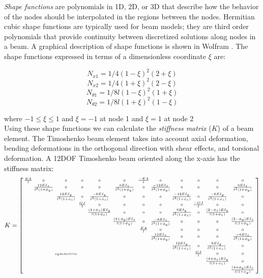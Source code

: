 {\textit{Shape functions} are polynomials in 1D, 2D, or 3D that describe how the behavior of the nodes should be interpolated in the regions between the nodes.  Hermitian cubic shape functions are typically used for beam models; they are third order polynomials that provide continuity between discretized solutions along nodes in a beam.  A graphical description of shape functions is shown in Wolfram \cite{Wolfram2016}.  The shape functions expressed in terms of a dimensionless coordinate $\xi$ are:

\[ N_{x1} = 1/4(1-\xi)^2(2+\xi) \]
\[ N_{x2} = 1/4(1+\xi)^2(2-\xi) \]
\[ N_{\theta1} = 1/8l(1-\xi)^2(1+\xi) \]
\[ N_{\theta2} = 1/8l(1+\xi)^2(1-\xi) \]

where $-1 \leq \xi \leq 1$ and $\xi = -1$ at node 1 and $\xi = 1$ at node 2\\

Using these shape functions we can calculate the \textit{stiffness matrix} ($K$) of a beam element.  The Timoshenko beam element takes into account axial deformation, bending deformations in the orthogonal direction with shear effects, and torsional deformation.  A 12DOF Timoshenko beam oriented along the x-axis has the stiffness matrix:\\

\[ K =  \scriptsize {\left[ \begin{smallmatrix}
\tfrac{EA}{l} & 0 & 0 & 0 & 0 & 0 & \tfrac{-EA}{l} & 0 & 0 & 0 & 0 & 0\\
 & \tfrac{12EI_z}{l^3(1+\phi_y)} & 0 & 0 & 0 & \tfrac{6EI_z}{l^2(1+\phi_y)} & 0 & \tfrac{-12EI_z}{l^3(1+\phi_y)} & 0 & 0 & 0 & \tfrac{6EI_z}{l^2(1+\phi_y)}\\
 &  & \tfrac{12EI_y}{l^3(1+\phi_z)} & 0 & \tfrac{-6EI_y}{l^2(1+\phi_z)} & 0 & 0 & 0 & \tfrac{-12EI_y}{l^3(1+\phi_z)} & 0 & \tfrac{-6EI_y}{l^2(1+\phi_z)} & 0\\
 &  &  &  \tfrac{GJ}{l} &  0 &  0 &  0 &  0 &  0 & \tfrac{-GJ}{l} & 0 & 0\\
 &  &  &  & \tfrac{(4+\phi_z)EI_y}{l(1+\phi_z)} & 0 & 0 & 0 & \tfrac{6EI_y}{l^2(1+\phi_z)} & 0 & \tfrac{(2-\phi_z)EI_y}{l(1+\phi_z)} & 0\\
 &  &  &  &  & \tfrac{(4+\phi_y)EI_z}{l(1+\phi_y)} & 0 & \tfrac{-6EI_z}{l^2(1+\phi_y)} & 0 & 0 & 0 & \tfrac{(2-\phi_y)EI_z}{l(1+\phi_y)}\\
 &  &  &  &  &  & \tfrac{EA}{l}  & 0 & 0 & 0 & 0 & 0\\
 &  &  &  &  &  &  & \tfrac{12EI_z}{l^3(1+\phi_y)} & 0 & 0 & 0 & \tfrac{-6EI_z}{l^2(1+\phi_y)}\\
 &  &  &  &  &  &  &  & \tfrac{12EI_y}{l^3(1+\phi_z)} & 0 & \tfrac{6EI_y}{l^2(1+\phi_z)}\ & 0\\
 &  & symmetric &  &  &  &  &  &  & \tfrac{GJ}{l} & 0 & 0\\
 &  &  &  &  &  &  &  &  &  & \tfrac{(4+\phi_z)EI_y}{l(1+\phi_z)} & 0\\
  &  &  &  &  &  &  &  &  &  &  & \tfrac{(4+\phi_y)EI_z}{l(1+\phi_y)}\\
 \end{smallmatrix} \right] }\]
 
}
